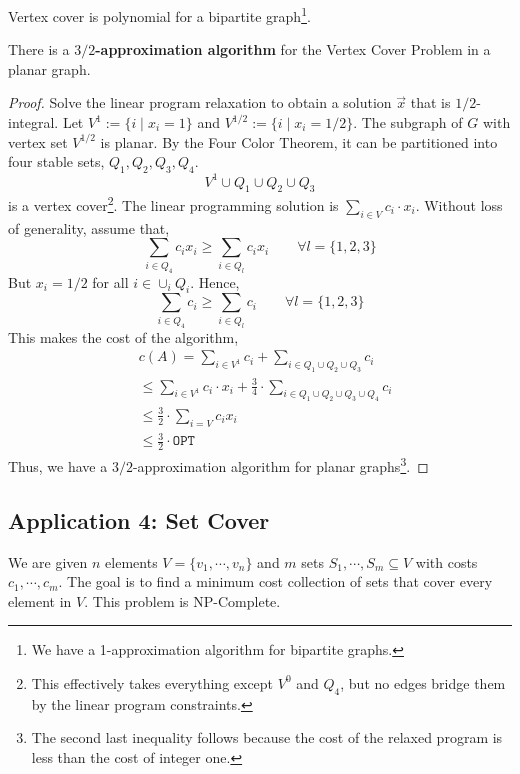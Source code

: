 \begin{cor}
	Vertex cover is polynomial for a bipartite graph\footnote{We have a 1-approximation algorithm for bipartite graphs.}.
\end{cor}

\begin{thm}
	There is a \textbf{$3/2$-approximation algorithm} for the Vertex Cover Problem in a planar graph.
\end{thm}

\begin{proof}
	Solve the linear program relaxation to obtain a solution $\Vec{x}$ that is $1/2$-integral. Let $V^1 := \{i \mid x_i = 1\}$ and $V^{1/2} := \{i \mid x_i = 1/2\}$. The subgraph of $G$ with vertex set $V^{1/2}$ is planar. By the Four Color Theorem, it can be partitioned into four stable sets, $Q_1, Q_2, Q_3, Q_4$.
	\[V^1 \cup Q_1 \cup Q_2 \cup Q_3\]
	\noindent is a vertex cover\footnote{This effectively takes everything except $V^0$ and $Q_4$, but no edges bridge them by the linear program constraints.}. The linear programming solution is $\sum_{i \in V} c_i \cdot x_i$. Without loss of generality, assume that,
	\[\sum_{i \in Q_4} c_{i} x_{i} \geq \sum_{i \in Q_l} c_{i} x_{i} \quad \quad \forall l=\{1,2,3\}\]
	\noindent But $x_i = 1/2$ for all $i \in \cup_i Q_i$. Hence,
	\[\sum_{i \in Q_4} c_i \geq \sum_{i \in Q_l} c_i \quad \quad \forall l=\{1,2,3\}\]
	\noindent This makes the cost of the algorithm,
	\begin{align*}
	&c(A)=\sum_{i \in V^1} c_{i}+\sum_{i \in Q_1 \cup Q_2 \cup Q_3} c_{i}\\
	&\leq \sum_{i \in V^1} c_{i} \cdot x_{i} + \frac{3}{4} \cdot \sum_{i \in Q_1 \cup Q_2 \cup Q_3 \cup Q_4} c_{i}\\
	&\leq \frac{3}{2} \cdot \sum_{i=V} c_{i} x_{i} \\
	&\leq \frac{3}{2} \cdot \texttt{OPT}
	\end{align*}
	\noindent Thus, we have a $3/2$-approximation algorithm for planar graphs\footnote{The second last inequality follows because the cost of the relaxed program is less than the cost of integer one.}.
\end{proof}

\subsection{Application 4: Set Cover}
We are given $n$ elements $V = \{v_1, \cdots, v_n\}$ and $m$ sets $S_1, \cdots, S_m \subseteq V$ with costs $c_1, \cdots, c_m$. The goal is to find a minimum cost collection of sets that cover every element in $V$. This problem is NP-Complete.

